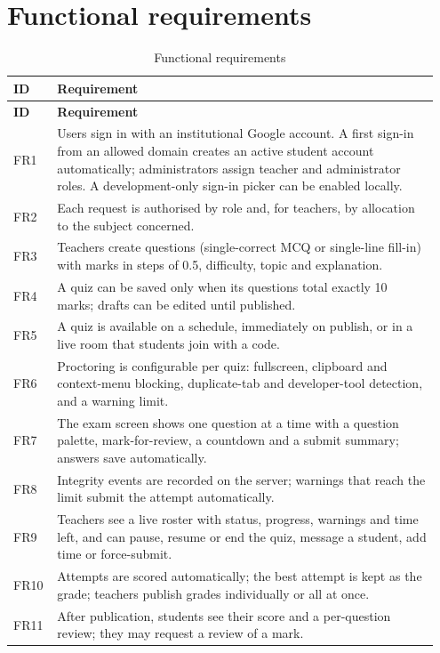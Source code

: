 \documentclass[12pt,a4paper,oneside]{report}
\begin{document}
\section{Functional requirements}
\begin{longtable}{@{}p{0.09\linewidth}p{0.86\linewidth}@{}}
\caption{Functional requirements}\label{tab:fr}\\
\toprule
\textbf{ID} & \textbf{Requirement}\\ \midrule
\endfirsthead
\toprule
\textbf{ID} & \textbf{Requirement}\\ \midrule
\endhead
FR1 & Users sign in with an institutional Google account. A first sign-in from an allowed domain creates an active student account automatically; administrators assign teacher and administrator roles. A development-only sign-in picker can be enabled locally.\\
FR2 & Each request is authorised by role and, for teachers, by allocation to the subject concerned.\\
FR3 & Teachers create questions (single-correct MCQ or single-line fill-in) with marks in steps of 0.5, difficulty, topic and explanation.\\
FR4 & A quiz can be saved only when its questions total exactly 10 marks; drafts can be edited until published.\\
FR5 & A quiz is available on a schedule, immediately on publish, or in a live room that students join with a code.\\
FR6 & Proctoring is configurable per quiz: fullscreen, clipboard and context-menu blocking, duplicate-tab and developer-tool detection, and a warning limit.\\
FR7 & The exam screen shows one question at a time with a question palette, mark-for-review, a countdown and a submit summary; answers save automatically.\\
FR8 & Integrity events are recorded on the server; warnings that reach the limit submit the attempt automatically.\\
FR9 & Teachers see a live roster with status, progress, warnings and time left, and can pause, resume or end the quiz, message a student, add time or force-submit.\\
FR10 & Attempts are scored automatically; the best attempt is kept as the grade; teachers publish grades individually or all at once.\\
FR11 & After publication, students see their score and a per-question review; they may request a review of a mark.\\

\end{longtable}
\end{document}
